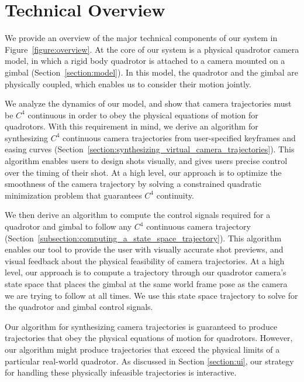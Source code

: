 \section{Technical Overview}

We provide an overview of the major technical components of our system in Figure~\ref{figure:overview}.
At the core of our system is a physical quadrotor camera model, in which a rigid body quadrotor is attached to a camera mounted on a gimbal (Section~\ref{section:model}).
In this model, the quadrotor and the gimbal are physically coupled, which enables us to consider their motion jointly.

We analyze the dynamics of our model, and show that camera trajectories must be $C^4$ continuous in order to obey the physical equations of motion for quadrotors.
With this requirement in mind, we derive an algorithm for synthesizing $C^4$ continuous camera trajectories from user-specified keyframes and easing curves (Section~\ref{section:synthesizing_virtual_camera_trajectories}).
This algorithm enables users to design shots visually, and gives users precise control over the timing of their shot.
At a high level, our approach is to optimize the smoothness of the camera trajectory by solving a constrained quadratic minimization problem that guarantees $C^4$ continuity.

We then derive an algorithm to compute the control signals required for a quadrotor and gimbal to follow any $C^4$ continuous camera trajectory (Section~\ref{subsection:computing_a_state_space_trajectory}).
This algorithm enables our tool to provide the user with visually accurate shot previews, and visual feedback about the physical feasibility of camera trajectories.
At a high level, our approach is to compute a trajectory through our quadrotor camera's state space that places the gimbal at the same world frame pose as the camera we are trying to follow at all times.
We use this state space trajectory to solve for the quadrotor and gimbal control signals.

Our algorithm for synthesizing camera trajectories is guaranteed to produce trajectories that obey the physical equations of motion for quadrotors.
However, our algorithm might produce trajectories that exceed the physical limits of a particular real-world quadrotor.
As discussed in Section \ref{section:ui}, our strategy for handling these physically infeasible trajectories is interactive.

